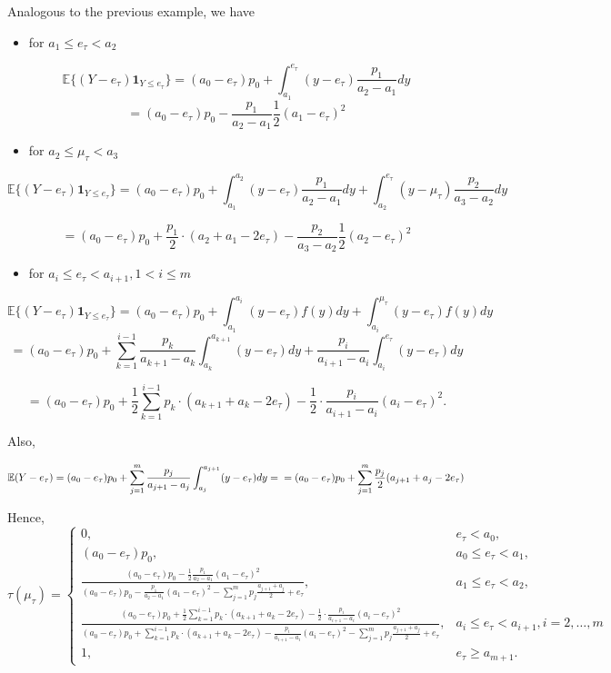 \documentclass[
]{article}
\providecommand{\tightlist}{%
  \setlength{\itemsep}{0pt}\setlength{\parskip}{0pt}}
\theoremstyle{definition}
\theoremstyle{definition}
\theoremstyle{definition}
\theoremstyle{definition}
\theoremstyle{remark}
\begin{document}
Analogous to the previous example, we have

\begin{itemize}
\tightlist
\item
  for \(a_1\leq e_\tau< a_2\)
\end{itemize}

\[\mathbb E\{(Y-e_\tau)\mathbf 1_{Y\leq e_\tau}\} = (a_0-e_\tau)p_0 + \int_{a_1}^{e_\tau}(y-e_\tau)\frac{p_1}{a_2-a_1}dy\]
\[= (a_0-e_\tau)p_0 -\frac{p_1}{a_2-a_1}\frac 12 (a_1-e_\tau)^2\]

\begin{itemize}
\tightlist
\item
  for \(a_2\leq \mu_\tau< a_3\)
\end{itemize}

\[\mathbb E\{(Y-e_\tau)\mathbf 1_{Y\leq e_\tau}\} = (a_0-e_\tau)p_0 + \int_{a_1}^{a_2}(y-e_\tau)\frac{p_1}{a_2-a_1}dy + \int_{a_2}^{e_\tau}(y-\mu_\tau)\frac{p_2}{a_3-a_2}dy\]

\[ = (a_0-e_\tau)p_0+\frac{p_1}2\cdot (a_2+a_1-2 e_\tau) -\frac{p_2}{a_3-a_2}\frac 12 (a_2-e_\tau)^2\]

\begin{itemize}
\tightlist
\item
  for \(a_i\leq e_\tau< a_{i+1}, 1<i\leq m\)
\end{itemize}

\[\mathbb E\{(Y-e_\tau)\mathbf 1_{Y\leq e_\tau}\} =(a_0-e_\tau)p_0 + \int_{a_1}^{a_{i}}(y-e_\tau)f(y)dy +  \int_{a_i}^{\mu_\tau}(y-e_\tau)f(y)dy\]
\[=(a_0-e_\tau)p_0+ \sum_{k=1}^{i-1}\frac{p_k}{a_{k+1}-a_k}\int_{a_k}^{a_{k+1}}(y-e_\tau)dy + \frac{p_i}{a_{i+1}-a_i} \int_{a_i}^{e_\tau}(y-e_\tau)dy\]

\[=(a_0-e_\tau)p_0+ \frac 12\sum_{k=1}^{i-1}p_k\cdot (a_{k+1}+a_{k}-2e_\tau) -\frac 12 \cdot \frac{p_i}{a_{i+1}-a_i}(a_i-e_\tau)^2.\]

Also,

\[\mathbb E(Y-e_\tau) =(a_0-e_\tau)p_0 + \sum_{j=1}^m\frac{p_j}{a_{j+1}-a_j}\int_{a_j}^{a_{j+1}}(y-e_\tau) dy = \\
=(a_0-e_\tau)p_0+ \sum_{j=1}^m\frac{p_j}2(a_{j+1}+a_j-2 e_\tau)\]

Hence,
\begin{equation}\tau(\mu_\tau) = \begin{cases}
0,&e_\tau<a_0,\\
(a_0-e_\tau)p_0,&a_0\leq e_\tau<a_1,\\
\frac{(a_0-e_\tau)p_0-\frac 12\frac{p_1}{a_2-a_1}(a_1-e_\tau)^2}  {(a_0-e_\tau)p_0-\frac{p_1}{a_2-a_1}(a_1-e_\tau)^2- \sum_{j=1}^mp_j\frac{a_{j+1}+a_j}2 +e_\tau} ,&a_1\leq e_\tau< a_2,\\
\frac{(a_0-e_\tau)p_0+\frac 12\sum_{k=1}^{i-1}p_k\cdot (a_{k+1}+a_{k}-2e_\tau) -\frac 12 \cdot \frac{p_i}{a_{i+1}-a_i}(a_i-e_\tau)^2}  {(a_0-e_\tau)p_0+\sum_{k=1}^{i-1}p_k\cdot (a_{k+1}+a_{k}-2e_\tau) -\frac{p_i}{a_{i+1}-a_i}(a_i-e_\tau)^2- \sum_{j=1}^mp_j\frac{a_{j+1}+a_j}2 +e_\tau} ,&a_i\leq e_\tau< a_{i+1},i=2,\ldots, m\\
1, &e_\tau\geq a_{m+1}.
\end{cases}\end{equation}
\end{document}
